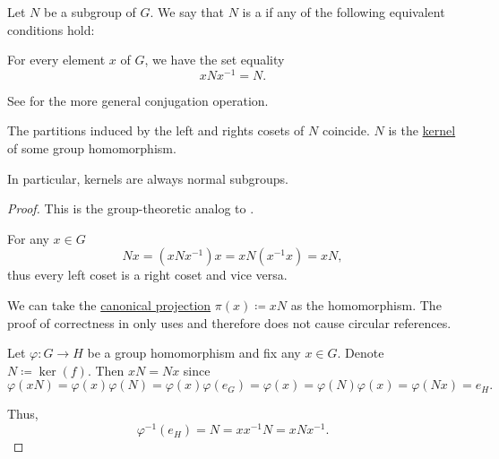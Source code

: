 \begin{definition}\label{def:normal_subgroup}
  Let \( N \) be a subgroup of \( G \). We say that \( N \) is a  if any of the following equivalent conditions hold:
  \begin{thmenum}
     For every element \( x \) of \( G \), we have the set equality
    \begin{equation}\label{eq:def:normal_subgroup/direct}
      x N x^{-1} = N.
    \end{equation}

    See  for the more general conjugation operation.

     The partitions induced by the left and rights cosets of \( N \) coincide.
     \( N \) is the \hyperref[def:pointed_set_kernel]{kernel} of some group homomorphism.
  \end{thmenum}

  In particular, kernels are always normal subgroups.
\end{definition}
\begin{proof}
  This is the group-theoretic analog to .

   For any \( x \in G \)
  \begin{equation*}
    N x = (x N x^{-1})x = x N(x^{-1}x) = x N,
  \end{equation*}
  thus every left coset is a right coset and vice versa.

   We can take the \hyperref[def:quotient_group]{canonical projection} \( \pi(x) \coloneqq x N \) as the homomorphism. The proof of correctness in  only uses  and therefore does not cause circular references.

   Let \( \varphi: G \to H \) be a group homomorphism and fix any \( x \in G \). Denote \( N \coloneqq \ker(f) \). Then \( x N = N x \) since
  \begin{equation*}
    \varphi(x N)
    =
    \varphi(x) \varphi(N)
    =
    \varphi(x) \varphi(e_G)
    =
    \varphi(x)
    =
    \varphi(N) \varphi(x)
    =
    \varphi(N x)
    =
    e_H.
  \end{equation*}

  Thus,
  \begin{equation*}
    \varphi^{-1}(e_H) = N = xx^{-1}N = x N x^{-1}.
  \end{equation*}
\end{proof}


